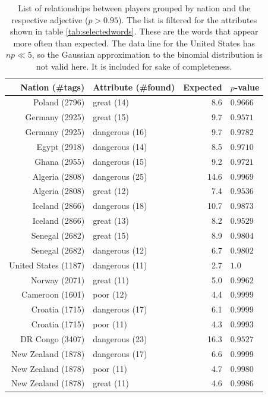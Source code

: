 \documentclass[10pt, a4paper]{UUThesisTemplate}
\begin{document}
\begin{table}\centering
\vspace{-10pt}
\scriptsize%
\begin{tabular}{r l r l}
Nation (\#tags) & Attribute (\#found) & Expected & $p$-value\\\hline
Poland (2796) & great (14) & 8.6 & $0.9666$\\
 Germany (2925) & great (15) & 9.7 & $0.9571$\\
 Germany (2925) & dangerous (16) & 9.7 & $0.9782$\\
 Egypt (2918) & dangerous (14) & 8.5 & $0.9710$\\
 Ghana (2955) & dangerous (15) & 9.2 & $0.9721$\\
 Algeria (2808) & dangerous (25) & 14.6 & $0.9969$\\
 Algeria (2808) & great (12) & 7.4 & $0.9536$\\
 Iceland (2866) & dangerous (18) & 10.7 & $0.9873$\\
 Iceland (2866) & great (13) & 8.2 & $0.9529$\\
 Senegal (2682) & great (15) & 8.9 & $0.9804$\\
 Senegal (2682) & dangerous (12) & 6.7 & $0.9802$\\
 {\color{gray}United States (1187)} & {\color{gray}dangerous (11)} & {\color{gray}2.7} & {\color{gray}$1.0$}\\
 Norway (2071) & great (11) & 5.0 & $0.9962$\\
 Cameroon (1601) & poor (12) & 4.4 & $0.9999$\\
 Croatia (1715) & dangerous (17) & 6.1 & $0.9999$\\
 Croatia (1715) & poor (11) & 4.3 & $0.9993$\\
 DR Congo (3407) & dangerous (23) & 16.3 & $0.9527$\\
 New Zealand (1878) & dangerous (17) & 6.6 & $0.9999$\\
 New Zealand (1878) & poor (11) & 4.7 & $0.9980$\\
 New Zealand (1878) & great (11) & 4.6 & $0.9986$\\\hline
 \end{tabular}
 \caption{List of relationships between players grouped by nation and the respective adjective ($p>0.95$). The list is filtered for the attributes shown in table \ref{tab:selectedwords}. These are the words that appear more often than expected. The data line for the United States has $np\ll5$, so the Gaussian approximation to the binomial distribution is not valid here. It is included for sake of completeness.}\label{tab:nationg0.96}
 \vspace{-20pt}
 \end{table}
\end{document}
